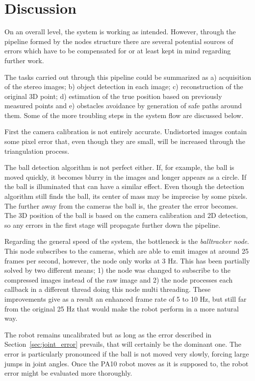 \chapter{Discussion}
\label{chap:discussion}
On an overall level, the system is working as intended.
However, through the pipeline formed by the nodes structure there are several potential sources of errors which have to be compensated for or at least kept in mind regarding further work.

The tasks carried out through this pipeline could be summarized as a) acquisition of the stereo images; b) object detection in each image; c) reconstruction of the original 3D point; d) estimation of the true position based on previously measured points and e) obstacles avoidance by generation of safe paths around them.
Some of the more troubling steps in the system flow are discussed below.

First the camera calibration is not entirely accurate.
Undistorted images contain some pixel error that, even though they are small, will be increased through the triangulation process.

The ball detection algorithm is not perfect either.
If, for example, the ball is moved quickly, it becomes blurry in the images and longer appears as a circle.
If the ball is illuminated that can have a similar effect.
Even though the detection algorithm still finds the ball, its center of mass may be imprecise by some pixels.
The further away from the cameras the ball is, the greater the error becomes.
The 3D position of the ball is based on the camera calibration and 2D detection, so any errors in the first stage will propagate further down the pipeline.

Regarding the general speed of the system, the bottleneck is the \emph{balltracker node}.
This node subscribes to the cameras, which are able to emit images at around 25 frames per second, however, the node only works at 3 Hz.
This has been partially solved by two different means; 1) the node was changed to subscribe to the compressed images instead of the raw image and 2) the node processes each callback in a different thread doing this node multi threading.
These improvements give as a result an enhanced frame rate of 5 to 10 Hz, but still far from the original 25 Hz that would make the robot perform in a more natural way.

The robot remains uncalibrated but as long as the error described in Section~\ref{sec:joint_error} prevails, that will certainly be the dominant one. The error is particularly pronounced if the ball is not moved very slowly, forcing large jumps in joint angles. Once the PA10 robot moves as it is supposed to, the robot error might be evaluated more thoroughly.

